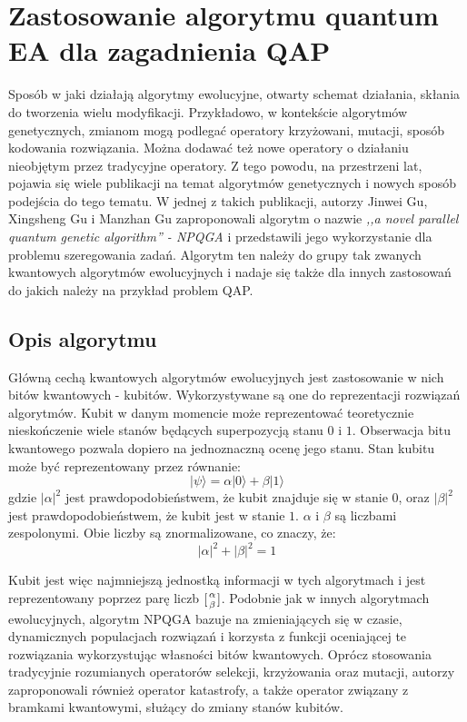 \chapter{Zastosowanie algorytmu quantum EA dla zagadnienia QAP}
\label{cha:qap_ea}
Sposób w jaki działają algorytmy ewolucyjne, otwarty schemat działania, skłania do tworzenia wielu modyfikacji. Przykładowo, w kontekście algorytmów genetycznych, zmianom mogą podlegać operatory krzyżowani, mutacji, sposób kodowania rozwiązania. Można dodawać też nowe operatory o działaniu nieobjętym przez tradycyjne operatory. Z tego powodu, na przestrzeni lat, pojawia się wiele publikacji na temat algorytmów genetycznych i nowych sposób podejścia do tego tematu. W jednej z takich publikacji, autorzy Jinwei Gu, Xingsheng Gu i Manzhan Gu zaproponowali algorytm o nazwie \textit{,,a novel parallel quantum genetic algorithm'' - NPQGA} i przedstawili jego wykorzystanie dla problemu szeregowania zadań.  Algorytm ten należy do grupy tak zwanych kwantowych algorytmów ewolucyjnych i nadaje się także dla innych zastosowań do jakich należy na przykład problem QAP.

\section{Opis algorytmu}
Główną cechą kwantowych algorytmów ewolucyjnych jest zastosowanie w nich bitów kwantowych - kubitów. Wykorzystywane są one do reprezentacji rozwiązań algorytmów. Kubit w danym momencie może reprezentować teoretycznie nieskończenie wiele stanów będących superpozycją stanu $0$ i $1$. Obserwacja bitu kwantowego pozwala dopiero na jednoznaczną ocenę jego stanu. Stan kubitu może być reprezentowany przez równanie:
\newline
\begin{equation}
|\psi\rangle=\alpha|0\rangle+\beta|1\rangle
\end{equation}
\newline
gdzie $|\alpha|^2$ jest prawdopodobieństwem, że kubit znajduje się w stanie $0$, oraz $|\beta|^2$ jest prawdopodobieństwem, że kubit jest w stanie $1$. $\alpha$ i $\beta$ są liczbami zespolonymi. Obie liczby są znormalizowane, co znaczy, że:
\newline
\begin{equation}
|\alpha|^2+|\beta|^2=1
\end{equation}
\newline 

Kubit jest więc najmniejszą jednostką informacji w tych algorytmach i jest reprezentowany poprzez parę liczb $[{\alpha \atop \beta}]$. Podobnie jak w innych algorytmach ewolucyjnych, algorytm NPQGA bazuje na zmieniających się w czasie, dynamicznych populacjach rozwiązań i korzysta z funkcji oceniającej te rozwiązania wykorzystując własności bitów kwantowych. Oprócz stosowania tradycyjnie rozumianych operatorów selekcji, krzyżowania oraz mutacji, autorzy zaproponowali również operator katastrofy, a także operator związany z bramkami kwantowymi, służący do zmiany stanów kubitów.

